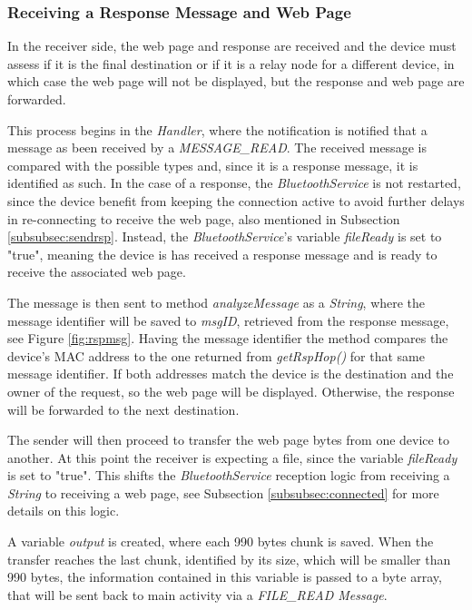 \subsubsection{Receiving a Response Message and Web Page}
\label{subsubsec:rcvrsp}

In the receiver side, the web page and response are received and the device must assess if it is the final destination or if it is a relay node for a different device, in which case the web page will not be displayed, but the response and web page are forwarded.

This process begins in the \textit{Handler}, where the notification is notified that a message as been received by a \textit{MESSAGE\_READ}. The received message is compared with the possible types and, since it is a response message, it is identified as such. In the case of a response, the \textit{BluetoothService} is not restarted, since the device benefit from keeping the connection active to avoid further delays in re-connecting to receive the web page, also mentioned in Subsection \ref{subsubsec:sendrsp}. Instead, the \textit{BluetoothService}'s variable \textit{fileReady} is set to "true", meaning the device is has received a response message and is ready to receive the associated web page.

The message is then sent to method \textit{analyzeMessage} as a \textit{String}, where the message identifier will be saved to \textit{msgID}, retrieved from the response message, see Figure \ref{fig:rspmsg}. Having the message identifier the method compares the device's \gls{MAC} address to the one returned from \textit{getRspHop()} for that same message identifier. If both addresses match the device is the destination and the owner of the request, so the web page will be displayed. Otherwise, the response will be forwarded to the next destination.

The sender will then proceed to transfer the web page bytes from one device to another. At this point the receiver is expecting a file, since the variable \textit{fileReady} is set to "true". This shifts the \textit{BluetoothService} reception logic from receiving a \textit{String} to receiving a web page, see Subsection \ref{subsubsec:connected} for more details on this logic.

A variable \textit{output} is created, where each 990 bytes chunk is saved. When the transfer reaches the last chunk, identified by its size, which will be smaller than 990 bytes, the information contained in this variable is passed to a byte array, that will be sent back to main activity via a \textit{FILE\_READ Message}.

